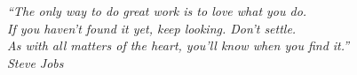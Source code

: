 \begin{epigrafe}
    \vspace*{\fill}
	\begin{flushright}
		\textit{``The only way to do great work is to love what you do. \\
                    If you haven’t found it yet, keep looking. Don’t settle. \\ 
                    As with all matters of the heart, you’ll know when you find it.''\\
		Steve Jobs}
	\end{flushright}
\end{epigrafe}
